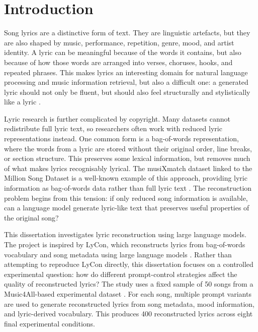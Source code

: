 \chapter{Introduction}

Song lyrics are a distinctive form of text. They are linguistic artefacts, but they are also shaped by music, performance, repetition, genre, mood, and artist identity. A lyric can be meaningful because of the words it contains, but also because of how those words are arranged into verses, choruses, hooks, and repeated phrases. This makes lyrics an interesting domain for natural language processing and music information retrieval, but also a difficult one: a generated lyric should not only be fluent, but should also feel structurally and stylistically like a lyric \cite{zhang2020youling,liang2024xailyricist}.

Lyric research is further complicated by copyright. Many datasets cannot redistribute full lyric text, so researchers often work with reduced lyric representations instead. One common form is a bag-of-words representation, where the words from a lyric are stored without their original order, line breaks, or section structure. This preserves some lexical information, but removes much of what makes lyrics recognisably lyrical. The musiXmatch dataset linked to the Million Song Dataset is a well-known example of this approach, providing lyric information as bag-of-words data rather than full lyric text \cite{bertinmahieux2011million,musixmatch2011dataset}. The reconstruction problem begins from this tension: if only reduced song information is available, can a language model generate lyric-like text that preserves useful properties of the original song?

This dissertation investigates lyric reconstruction using large language models. The project is inspired by LyCon, which reconstructs lyrics from bag-of-words vocabulary and song metadata using large language models \cite{kim2024lycon}. Rather than attempting to reproduce LyCon directly, this dissertation focuses on a controlled experimental question: how do different prompt-control strategies affect the quality of reconstructed lyrics? The study uses a fixed sample of 50 songs from a Music4All-based experimental dataset \cite{domingues2020music4all}. For each song, multiple prompt variants are used to generate reconstructed lyrics from song metadata, mood information, and lyric-derived vocabulary. This produces 400 reconstructed lyrics across eight final experimental conditions.

